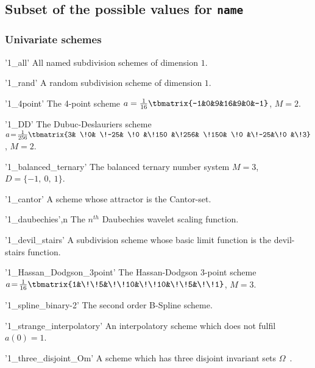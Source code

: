 \subsection{Subset of the possible values for \texttt{name}}

\subsubsection{Univariate schemes}
\begin{param}    
\item['1\_all'] All named subdivision schemes of dimension $1$.
\item['1\_rand'] A random subdivision scheme of dimension $1$.
\item['1\_4point'] The 4-point scheme {\small$a=\frac{1}{16}\tbmatrix{-1&0&9&16&9&0&-1}$}, $M=2$.
\item['1\_DD'] The Dubuc-Deslauriers scheme {\small $a\!=\!\frac{1}{256}\tbmatrix{3& \!0& \!-25& \!0 &\!150 &\!256& \!150& \!0 &\!-25&\!0 &\!3}$}, $M\!=\!2$.
\item['1\_balanced\_ternary'] The balanced ternary number system $M=3$, $D=\{-1,\ 0,\ 1\}$.
\item['1\_cantor'] A scheme whose attractor is the Cantor-set.
\item['1\_daubechies',n] The $n^{th}$ Daubechies wavelet scaling function.
\item['1\_devil\_stairs'] A subdivision scheme whose basic limit function is the devil-stairs function.
\item['1\_Hassan\_Dodgson\_3point'] The Hassan-Dodgson 3-point scheme {\small$a\!=\!\frac{1}{16}\tbmatrix{1&\!\!5&\!\!10&\!\!10&\!\!5&\!\!1}$}, $M\!=\!3$.
\item['1\_spline\_binary-2'] The second order B-Spline scheme.
\item['1\_strange\_interpolatory'] An interpolatory scheme which does not fulfil $a(0)=1$.
\item['1\_three\_disjoint\_Om'] A scheme which has three disjoint invariant sets $\Omega$~\cite{CM18}.
\end{param}



